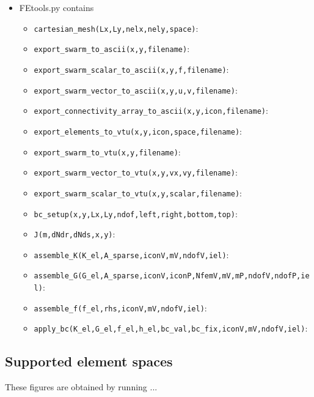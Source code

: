 \begin{itemize}
\item {\pythonfile FEtools.py} contains

\begin{itemize}
\item \lstinline{cartesian_mesh(Lx,Ly,nelx,nely,space)}:
\item \lstinline{export_swarm_to_ascii(x,y,filename)}:
\item \lstinline{export_swarm_scalar_to_ascii(x,y,f,filename)}:
\item \lstinline{export_swarm_vector_to_ascii(x,y,u,v,filename)}:
\item \lstinline{export_connectivity_array_to_ascii(x,y,icon,filename)}:
\item \lstinline{export_elements_to_vtu(x,y,icon,space,filename)}:
\item \lstinline{export_swarm_to_vtu(x,y,filename)}:
\item \lstinline{export_swarm_vector_to_vtu(x,y,vx,vy,filename)}:
\item \lstinline{export_swarm_scalar_to_vtu(x,y,scalar,filename)}:
\item \lstinline{bc_setup(x,y,Lx,Ly,ndof,left,right,bottom,top)}:
\item \lstinline{J(m,dNdr,dNds,x,y)}:
\item \lstinline{assemble_K(K_el,A_sparse,iconV,mV,ndofV,iel)}:
\item \lstinline{assemble_G(G_el,A_sparse,iconV,iconP,NfemV,mV,mP,ndofV,ndofP,iel)}:
\item \lstinline{assemble_f(f_el,rhs,iconV,mV,ndofV,iel)}:
\item \lstinline{apply_bc(K_el,G_el,f_el,h_el,bc_val,bc_fix,iconV,mV,ndofV,iel)}:
\end{itemize}

\end{itemize}

\newpage
\subsection*{Supported element spaces}

These figures are obtained by running ...


